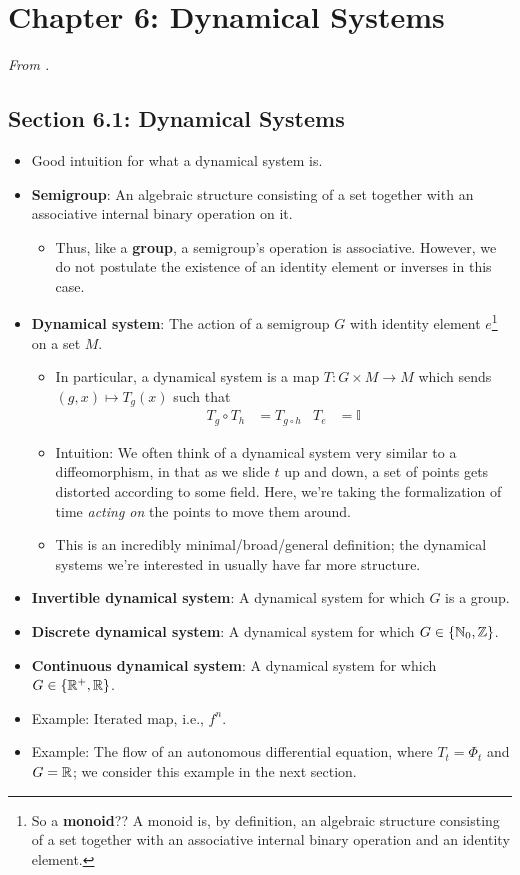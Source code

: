 \documentclass[../notes.tex]{subfiles}
\begin{document}
\section{Chapter 6: Dynamical Systems}
\emph{From \textcite{bib:Teschl}.}
\subsection*{Section 6.1: Dynamical Systems}
\begin{itemize}
    \item Good intuition for what a dynamical system is.
    \item \textbf{Semigroup}: An algebraic structure consisting of a set together with an associative internal binary operation on it.
    \begin{itemize}
        \item Thus, like a \textbf{group}, a semigroup's operation is associative. However, we do not postulate the existence of an identity element or inverses in this case.
    \end{itemize}
    \item \textbf{Dynamical system}: The action of a semigroup $G$ with identity element $e$\footnote{So a \textbf{monoid}?? A monoid is, by definition, an algebraic structure consisting of a set together with an associative internal binary operation and an identity element.} on a set $M$.
    \begin{itemize}
        \item In particular, a dynamical system is a map $T:G\times M\to M$ which sends $(g,x)\mapsto T_g(x)$ such that
        \begin{align*}
            T_g\circ T_h &= T_{g\circ h}&
            T_e &= \mathbb{I}
        \end{align*}
        \item Intuition: We often think of a dynamical system very similar to a diffeomorphism, in that as we slide $t$ up and down, a set of points gets distorted according to some field. Here, we're taking the formalization of time \emph{acting on} the points to move them around.
        \item This is an incredibly minimal/broad/general definition; the dynamical systems we're interested in usually have far more structure.
    \end{itemize}
    \item \textbf{Invertible dynamical system}: A dynamical system for which $G$ is a group.
    \item \textbf{Discrete dynamical system}: A dynamical system for which $G\in\{\mathbb{N}_0,\mathbb{Z}\}$.
    \item \textbf{Continuous dynamical system}: A dynamical system for which $G\in\{\mathbb{R}^+,\mathbb{R}\}$.
    \item Example: Iterated map, i.e., $f^n$.
    \item Example: The flow of an autonomous differential equation, where $T_t=\Phi_t$ and $G=\mathbb{R}$; we consider this example in the next section.
\end{itemize}
\end{document}
